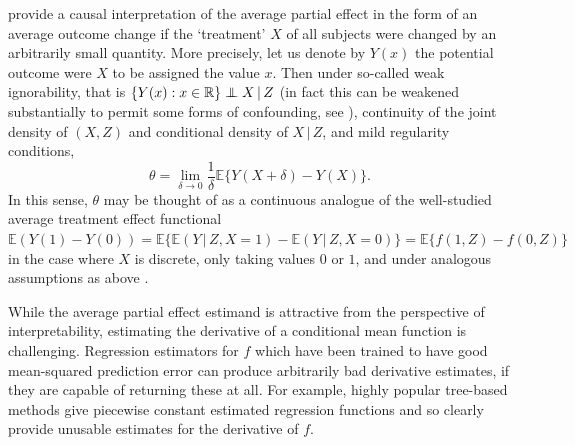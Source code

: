\documentclass[aos]{imsart}
\newcommand{\R}{\mathbb{R}}
\newcommand{\E}{\mathbb{E}}
\newcommand{\given}{\,|\,}
\newcommand{\independent}{\mbox{${}\perp\mkern-11mu\perp{}$}}
\begin{document}
	
	
	\citet{RothenhauslerICE} provide a causal interpretation of the average partial effect in the form of an average outcome change if the `treatment' $X$ of all subjects were changed by an arbitrarily small quantity. More precisely, let us denote by $Y(x)$ the potential outcome \citep{rubin1974estimating} were $X$ to be assigned the value $x$. Then under so-called weak ignorability, that is $\{Y(x) : x \in \R\} \independent X \given Z$ (in fact this can be weakened substantially to permit some forms of confounding, see \citet[Assumption~1]{RothenhauslerICE}), continuity of the joint density of $(X, Z)$ and conditional density of $X \given Z$,
	and mild regularity conditions,
	\[
	\theta = \lim_{\delta \to 0} \frac{1}{\delta} \E \{ Y(X + \delta) - Y(X)\}.
	\]
	In this sense, $\theta$ may be thought of as a continuous analogue of the well-studied average treatment effect functional
	$
	\E(Y(1) - Y(0)) = \E\{\E( Y \given Z, X=1) - \E(Y \given Z, X = 0)\} = \E\{f(1, Z) - f(0, Z)\}
	$
	in the case where $X$ is discrete, only taking values $0$ or $1$, and under analogous assumptions as above  \citep{RRZ94, RR95, SRR99}.
	
	While the average partial effect estimand is attractive from the perspective of interpretability, estimating the derivative of a conditional mean function is challenging. Regression estimators for $f$ which have been trained to have good mean-squared prediction error can produce arbitrarily bad derivative estimates, if they are capable of returning these at all. For example, highly popular tree-based methods give piecewise constant estimated regression functions and so clearly provide unusable estimates for the derivative of $f$.
	
\end{document}
